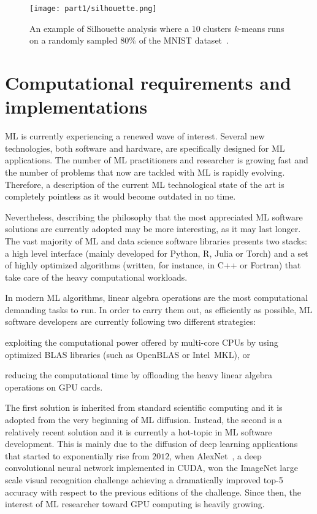 	\begin{figure}[]
		\centering
		\texttt{[image: part1/silhouette.png]}
		\caption{An example of Silhouette analysis where a $10$ clusters $k$-means runs on a randomly sampled $80\%$ of the MNIST dataset~\cite{lecun2010mnist}.} \label{fig:silhouette}
	\end{figure}


\section{Computational requirements and implementations} \label{sec:implementation}

ML is currently experiencing a renewed wave of interest. Several new technologies, both software and hardware, are specifically designed for ML applications. The number of ML practitioners and researcher is growing fast and the number of problems that now are tackled with ML is rapidly evolving. Therefore, a description of the current ML technological state of the art is completely pointless as it would become outdated in no time.

Nevertheless, describing the philosophy that the most appreciated ML software solutions are currently adopted may be more interesting, as it may last longer. The vast majority of ML and data science software libraries presents two stacks: a high level interface (mainly developed for Python, R, Julia or Torch) and a set of highly optimized algorithms (written, for instance, in C++ or Fortran) that take care of the heavy computational workloads.

In modern ML algorithms, linear algebra operations are the most computational demanding tasks to run. In order to carry them out, as efficiently as possible, ML software developers are currently following two different strategies:
\begin{enumerate*}[label=(\roman*)]
	\item exploiting the computational power offered by multi-core \ac{CPU}s by using optimized \ac{BLAS} libraries (such as OpenBLAS or Intel\textsuperscript{\textregistered}~\ac{MKL}), or
	\item reducing the computational time by offloading the heavy linear algebra operations on \ac{GPU} cards.
\end{enumerate*}

The first solution is inherited from standard scientific computing and it is adopted from the very beginning of ML diffusion. Instead, the second is a relatively recent solution and it is currently a hot-topic in ML software development. This is mainly due to the diffusion of deep learning applications that started to exponentially rise from $2012$, when AlexNet~\cite{krizhevsky2012imagenet}, a deep convolutional neural network implemented in CUDA, won the ImageNet large scale visual recognition challenge achieving a dramatically improved top-5 accuracy with respect to the previous editions of the challenge.
Since then, the interest of ML researcher toward GPU computing is heavily growing.


